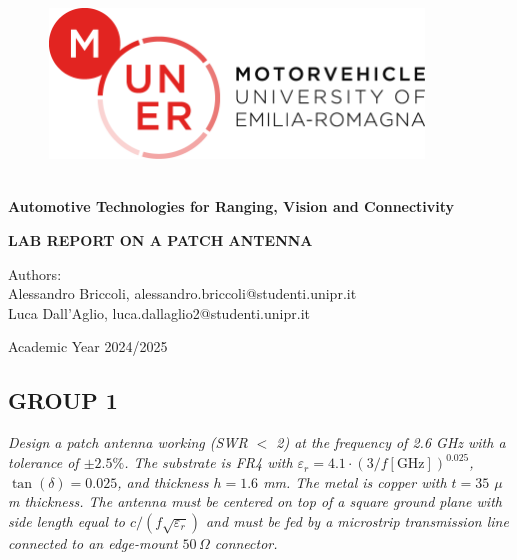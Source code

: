 \documentclass[]{article}
\author{Alessandro Briccoli }
\begin{document}
	\thispagestyle{empty}
	\begin{figure}[h] %
		\centering
		\includegraphics[height=4cm, width=10cm]{img/Muner_Color} 
	\end{figure}
	
	\begin{center}  %
		\hspace{2em}
		\\
		{\LARGE\textbf{Automotive Technologies for Ranging, Vision and Connectivity}}
		\hspace{2em}
	\end{center}
	
	\thispagestyle{empty}
	\vspace*{\fill} 
	\begin{center}
		{\LARGE\textbf{LAB REPORT ON A PATCH ANTENNA}}
	\end{center}
	\vspace*{\fill}
	
	\vspace{1cm} 
	\vspace{1cm} 
	\begin{flushleft}
		Authors:\\
		\hspace{1.5em}Alessandro Briccoli, alessandro.briccoli@studenti.unipr.it\\
		\hspace{1.5em}Luca Dall'Aglio, luca.dallaglio2@studenti.unipr.it
		
	\end{flushleft}
	
	\vspace{2cm} 
	\begin{center}
		Academic Year 2024/2025
	\end{center}
	
	\newpage
	
	\thispagestyle{empty}
	\tableofcontents
	
	\newpage
	\setcounter{page}{1}
	\subsection*{GROUP 1}
	\textit{Design a patch antenna working (SWR $<$ 2) at the frequency of 2.6 GHz with a tolerance of $\pm 2.5\%$. The substrate is FR4 with $\varepsilon_r = 4.1 \cdot (3/f[\text{GHz}])^{0.025}$, $\tan(\delta) = 0.025$, and thickness $h = 1.6$ mm. The metal is copper with $t = 35$ $\mu$m thickness. The antenna must be centered on top of a square ground plane with side length equal to $c / (f\sqrt{\varepsilon_r})$ and must be fed by a microstrip transmission line connected to an edge-mount $50 \, \Omega$ connector.}
\end{document}
